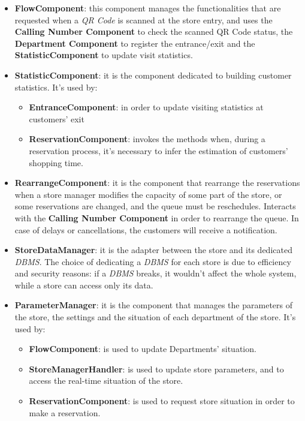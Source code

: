 \documentclass{article}
\begin{document}
			\begin{itemize}
				\item {\bfseries FlowComponent}: this component manages the functionalities that are requested when a \emph{QR Code} is scanned at the store entry, and uses the {\bfseries Calling Number Component} to check the scanned QR Code status, the {\bfseries Department Component} to register the entrance/exit and the {\bfseries StatisticComponent} to update visit statistics.
				
				\item {\bfseries StatisticComponent}: it is the component dedicated to building customer statistics. It’s used by:
				
				\begin{itemize}
					\item {\bfseries EntranceComponent}: in order to update visiting statistics at customers’ exit
					\item {\bfseries ReservationComponent}: invokes the methods when, during a reservation process, it’s necessary to infer the estimation of customers’ shopping time.
				\end{itemize}
			
				\item {\bfseries RearrangeComponent}: it is the component that rearrange the reservations when a store manager modifies the capacity of some part of the store, or some reservations are changed, and the queue must be reschedules. Interacts with the {\bfseries Calling Number Component} in order to rearrange the queue. In case of delays or cancellations, the customers will receive a notification.
				
				\item {\bfseries StoreDataManager}: it is the adapter between the store and its dedicated \emph{DBMS}. The choice of dedicating a \emph{DBMS} for each store is due to efficiency and security reasons: if a \emph{DBMS} breaks, it wouldn't affect the whole system, while a store can access only its data.
				
				\item {\bfseries ParameterManager}: it is the component that manages the parameters of the store, the settings and the situation of each department of the store. It’s used by:
				
				\begin{itemize}
					\item {\bfseries FlowComponent}: is used to update Departments’ situation.
					\item {\bfseries StoreManagerHandler}: is used to update store parameters, and to access the real-time situation of the store.
					\item {\bfseries ReservationComponent}: is used to request store situation in order to make a reservation.
				\end{itemize}
			

\end{itemize}
\end{document}
